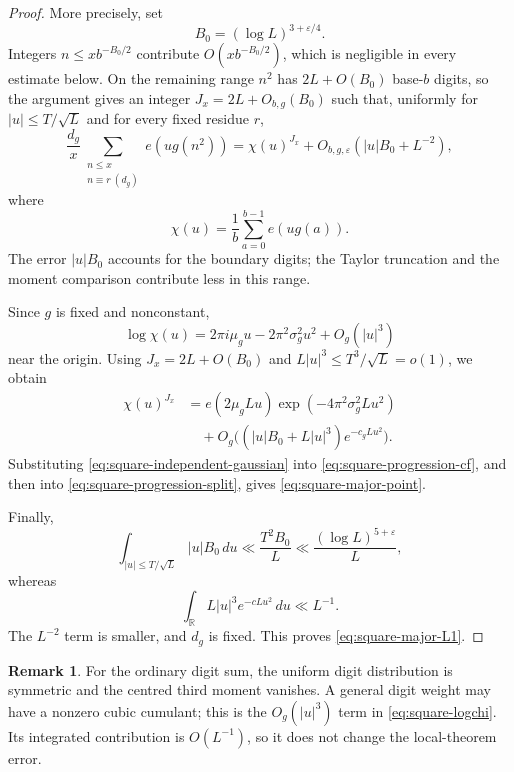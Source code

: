 \documentclass[11pt,reqno]{amsart}
\theoremstyle{plain}
\theoremstyle{definition}
\newtheorem{remark}[theorem]{Remark}
\newcommand{\R}{\mathbb{R}}
\newcommand{\eps}{\varepsilon}
\newcommand{\ee}[1]{e\!\left(#1\right)}
\newcommand{\1}{\mathbf 1}
\begin{document}
\begin{proof}
More precisely, set
\[
 B_0=(\log L)^{3+\eps/4}.
\]
Integers $n\le xb^{-B_0/2}$ contribute $O(xb^{-B_0/2})$, which is negligible in every estimate below.  On the remaining range $n^2$ has $2L+O(B_0)$ base-$b$ digits, so the argument gives an integer $J_x=2L+O_{b,g}(B_0)$ such that, uniformly for $|u|\le T/\sqrt L$ and for every fixed residue $r$,
\begin{equation}\label{eq:square-progression-cf}
 \frac{d_g}{x}\sum_{\substack{n\le x\\n\equiv r\ (d_g)}}\ee{u g(n^2)}
 =\chi(u)^{J_x}+O_{b,g,\eps}(|u|B_0+L^{-2}),
\end{equation}
where
\begin{equation}\label{eq:square-one-digit-cf}
 \chi(u)=\frac1b\sum_{a=0}^{b-1}\ee{u g(a)}.
\end{equation}
The error $|u|B_0$ accounts for the boundary digits; the Taylor truncation and the moment comparison contribute less in this range.

Since $g$ is fixed and nonconstant,
\begin{equation}\label{eq:square-logchi}
 \log\chi(u)=2\pi i\mu_gu-2\pi^2\sigma_g^2u^2+O_g(|u|^3)
\end{equation}
near the origin.  Using $J_x=2L+O(B_0)$ and $L|u|^3\le T^3/\sqrt L=o(1)$, we obtain
\begin{equation}\label{eq:square-independent-gaussian}
\begin{split}
 \chi(u)^{J_x}
 &=\ee{2\mu_gLu}\exp(-4\pi^2\sigma_g^2Lu^2)\\
 &\quad+O_g\bigl((|u|B_0+L|u|^3)e^{-c_gLu^2}\bigr).
\end{split}
\end{equation}
Substituting \eqref{eq:square-independent-gaussian} into \eqref{eq:square-progression-cf}, and then into \eqref{eq:square-progression-split}, gives \eqref{eq:square-major-point}.

Finally,
\[
 \int_{|u|\le T/\sqrt L}|u|B_0\,du
 \ll \frac{T^2B_0}{L}
 \ll\frac{(\log L)^{5+\eps}}{L},
\]
whereas
\[
 \int_{\R}L|u|^3e^{-cLu^2}\,du\ll L^{-1}.
\]
The $L^{-2}$ term is smaller, and $d_g$ is fixed.  This proves \eqref{eq:square-major-L1}.
\end{proof}

\begin{remark}\label{rem:square-cubic}
For the ordinary digit sum, the uniform digit distribution is symmetric and the centred third moment vanishes.  A general digit weight may have a nonzero cubic cumulant; this is the $O_g(|u|^3)$ term in \eqref{eq:square-logchi}.  Its integrated contribution is $O(L^{-1})$, so it does not change the local-theorem error.
\end{remark}
\end{document}
